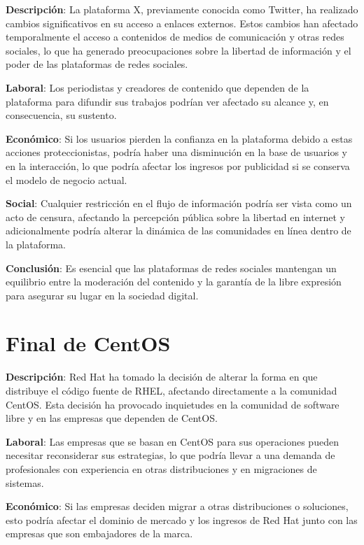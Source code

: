 \documentclass{article}
\begin{document}
\textbf{Descripción}: La plataforma X, previamente conocida como Twitter, ha realizado cambios significativos en su acceso a enlaces externos. Estos cambios han afectado temporalmente el acceso a contenidos de medios de comunicación y otras redes sociales, lo que ha generado preocupaciones sobre la libertad de información y el poder de las plataformas de redes sociales.

\textbf{Laboral}: Los periodistas y creadores de contenido que dependen de la plataforma para difundir sus trabajos podrían ver afectado su alcance y, en consecuencia, su sustento.

\textbf{Económico}: Si los usuarios pierden la confianza en la plataforma debido a estas acciones proteccionistas, podría haber una disminución en la base de usuarios y en la interacción, lo que podría afectar los ingresos por publicidad si se conserva el modelo de negocio actual.

\textbf{Social}: Cualquier restricción en el flujo de información podría ser vista como un acto de censura, afectando la percepción pública sobre la libertad en internet y adicionalmente podría alterar la dinámica de las comunidades en línea dentro de la plataforma.

\textbf{Conclusión}: Es esencial que las plataformas de redes sociales mantengan un equilibrio entre la moderación del contenido y la garantía de la libre expresión para asegurar su lugar en la sociedad digital.

\section*{Final de CentOS}

\textbf{Descripción}: Red Hat ha tomado la decisión de alterar la forma en que distribuye el código fuente de RHEL, afectando directamente a la comunidad CentOS. Esta decisión ha provocado inquietudes en la comunidad de software libre y en las empresas que dependen de CentOS.

\textbf{Laboral}: Las empresas que se basan en CentOS para sus operaciones pueden necesitar reconsiderar sus estrategias, lo que podría llevar a una demanda de profesionales con experiencia en otras distribuciones y en migraciones de sistemas.

\textbf{Económico}: Si las empresas deciden migrar a otras distribuciones o soluciones, esto podría afectar el dominio de mercado y los ingresos de Red Hat junto con las empresas que son embajadores de la marca.
\end{document}

